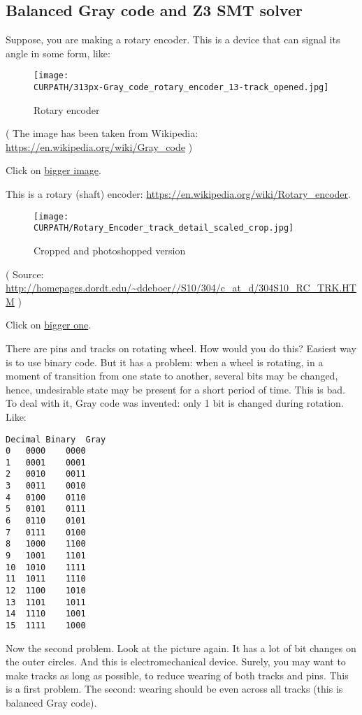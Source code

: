 \subsection{Balanced Gray code and Z3 SMT solver}
\label{Gray_Z3}

\renewcommand{\CURPATH}{gray_code/SMT}

Suppose, you are making a rotary encoder.
This is a device that can signal its angle in some form, like:

\begin{figure}[H]
\centering
\texttt{[image: \\CURPATH/313px-Gray\_code\_rotary\_encoder\_13-track\_opened.jpg]}
\caption{Rotary encoder}
\end{figure}

( The image has been taken from Wikipedia: \url{https://en.wikipedia.org/wiki/Gray_code} )

Click on \href{.../blog/gray/Gray_code_rotary_encoder_13-track_opened.jpg}{bigger image}.

This is a rotary (shaft) encoder: \url{https://en.wikipedia.org/wiki/Rotary_encoder}.

\begin{figure}[H]
\centering
\texttt{[image: \\CURPATH/Rotary\_Encoder\_track\_detail\_scaled\_crop.jpg]}
\caption{Cropped and photoshopped version}
\end{figure}

( Source: \url{http://homepages.dordt.edu/~ddeboer//S10/304/c_at_d/304S10_RC_TRK.HTM} )

Click on
\href{.../Rotary_Encoder_track_detail.jpg}{bigger one}.

There are pins and tracks on rotating wheel.
How would you do this?
Easiest way is to use binary code.
But it has a problem: when a wheel is rotating, in a moment of transition from one state to another, several bits may be changed, hence, undesirable state may be present for a short period of time.
This is bad.
To deal with it, Gray code was invented: only 1 bit is changed during rotation.
Like:

\begin{lstlisting}
Decimal Binary  Gray
0 	0000 	0000
1 	0001 	0001
2 	0010 	0011
3 	0011 	0010
4 	0100 	0110
5 	0101 	0111
6 	0110 	0101
7 	0111 	0100
8 	1000 	1100
9 	1001 	1101
10 	1010 	1111
11 	1011 	1110
12 	1100 	1010
13 	1101 	1011
14 	1110 	1001
15 	1111 	1000
\end{lstlisting}

Now the second problem. Look at the picture again. It has a lot of bit changes on the outer circles.
And this is electromechanical device.
Surely, you may want to make tracks as long as possible, to reduce wearing of both tracks and pins.
This is a first problem.
The second: wearing should be even across all tracks (this is balanced Gray code).

